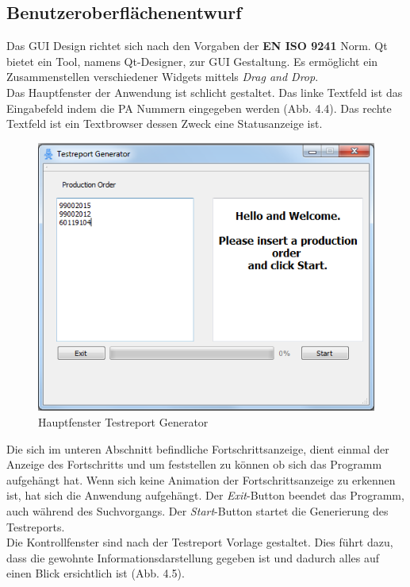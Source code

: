 \subsection{Benutzeroberflächenentwurf}
Das \ac{GUI} Design richtet sich nach den Vorgaben der \textbf{EN ISO 9241} Norm. Qt bietet ein Tool, namens Qt-Designer, zur \ac{GUI} Gestaltung. Es ermöglicht ein Zusammenstellen verschiedener Widgets mittels \textit{Drag and Drop}. \\
Das Hauptfenster der Anwendung ist schlicht gestaltet. Das linke Textfeld ist das Eingabefeld indem die \ac{PA} Nummern eingegeben werden (Abb. 4.4). Das rechte Textfeld ist ein Textbrowser dessen Zweck eine Statusanzeige ist.
\begin{figure}[!htbp]
\centering
\includegraphics[scale=0.7]{images/mainwindow}
\caption{Hauptfenster Testreport Generator}
\label{fig:Hauptfenster Testreport Generator}
\end{figure}
Die sich im unteren Abschnitt befindliche Fortschrittsanzeige, dient einmal der Anzeige des Fortschritts und um feststellen zu können ob sich das Programm aufgehängt hat. Wenn sich keine Animation der Fortschrittsanzeige zu erkennen ist, hat sich die Anwendung aufgehängt. Der \textit{Exit}-Button beendet das Programm, auch während des Suchvorgangs. Der \textit{Start}-Button startet die Generierung des Testreports. \\
Die Kontrollfenster sind nach der Testreport Vorlage gestaltet. Dies führt dazu, dass die gewohnte Informationsdarstellung gegeben ist und dadurch alles auf einen Blick ersichtlich ist (Abb. 4.5).
